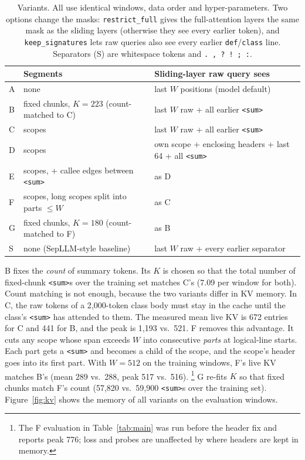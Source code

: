 \documentclass[10pt,twocolumn]{article}
\makeatletter
\renewcommand{\subsection}{\@startsection{subsection}{2}{\z@}{12pt}{4pt}{\normalfont\normalsize\bfseries}}
\newcommand{\sumtok}{\texttt{<sum>}}
\makeatother
\begin{document}
\begin{table}[t]
\centering
\caption{Variants. All use identical windows, data order and hyper-parameters.
Two options change the masks: \texttt{restrict\_full} gives the
full-attention layers the same mask as the sliding layers (otherwise they
see every earlier token), and \texttt{keep\_signatures} lets raw queries also
see every earlier \texttt{def}/\texttt{class} line. Separators (S) are
whitespace tokens and \texttt{.}~\texttt{,}~\texttt{?}~\texttt{!}~\texttt{;}~\texttt{:}.}\small
\begin{tabular}{@{}lll@{}}
\toprule
& Segments & Sliding-layer raw query sees \\
\midrule
A & none & last $W$ positions (model default) \\
B & fixed chunks, $K=223$ (count-matched to C) & last $W$ raw + all earlier \sumtok{} \\
C & scopes & last $W$ raw + all earlier \sumtok{} \\
D & scopes & own scope + enclosing headers + last 64 + all \sumtok{} \\
E & scopes, + callee edges between \sumtok{} & as D \\
F & scopes, long scopes split into parts $\le W$ & as C \\
G & fixed chunks, $K=180$ (count-matched to F) & as B \\
S & none (SepLLM-style baseline) & last $W$ raw + every earlier separator \\
\bottomrule
\end{tabular}

\label{tab:variants}
\end{table}

\subsection{Fair comparison}\label{sec:fair}

B fixes the \emph{count} of summary tokens. Its $K$ is chosen so that the
total number of fixed-chunk \sumtok{}s over the training set matches C's
(7.09 per window for both). Count matching is not enough,
because the two variants differ in KV memory. In C, the raw tokens of a
2{,}000-token class body must stay in the cache until the class's \sumtok{}
has attended to them. The measured mean live KV is 672 entries for C and 441
for B, and the peak is 1{,}193 vs.\ 521. F removes this advantage. It cuts any
scope whose span exceeds $W$ into consecutive \emph{parts} at logical-line
starts. Each part gets a \sumtok{} and becomes a child of the scope, and the
scope's header goes into its first part. With $W=512$ on the training
windows, F's live KV matches B's (mean 289 vs.\ 288, peak 517 vs.\ 516).%
\footnote{The F evaluation in Table~\ref{tab:main} was run before the header
fix and reports peak 776; loss and probes are unaffected by where headers are
kept in memory.}
G re-fits $K$ so that fixed chunks match F's count (57{,}820 vs.\ 59{,}900
\sumtok{}s over the training set). Figure~\ref{fig:kv} shows the memory of
all variants on the evaluation windows.
\end{document}
